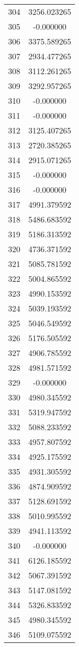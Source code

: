 \documentclass[12pt]{article}
\begin{document}
\begin{longtable}{@{}cc@{}}
304 & 3256.023265 \\
305 & -0.000000 \\
306 & 3375.589265 \\
307 & 2934.477265 \\
308 & 3112.261265 \\
309 & 3292.957265 \\
310 & -0.000000 \\
311 & -0.000000 \\
312 & 3125.407265 \\
313 & 2720.385265 \\
314 & 2915.071265 \\
315 & -0.000000 \\
316 & -0.000000 \\
317 & 4991.379592 \\
318 & 5486.683592 \\
319 & 5186.313592 \\
320 & 4736.371592 \\
321 & 5085.781592 \\
322 & 5004.865592 \\
323 & 4990.153592 \\
324 & 5039.193592 \\
325 & 5046.549592 \\
326 & 5176.505592 \\
327 & 4906.785592 \\
328 & 4981.571592 \\
329 & -0.000000 \\
330 & 4980.345592 \\
331 & 5319.947592 \\
332 & 5088.233592 \\
333 & 4957.807592 \\
334 & 4925.175592 \\
335 & 4931.305592 \\
336 & 4874.909592 \\
337 & 5128.691592 \\
338 & 5010.995592 \\
339 & 4941.113592 \\
340 & -0.000000 \\
341 & 6126.185592 \\
342 & 5067.391592 \\
343 & 5147.081592 \\
344 & 5326.833592 \\
345 & 4980.345592 \\
346 & 5109.075592 \\

\end{longtable}
\end{document}
